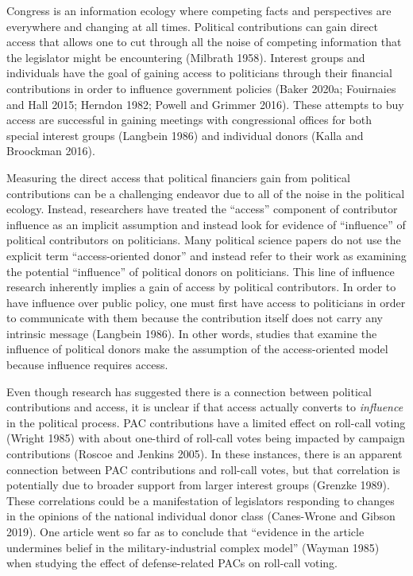 \documentclass[12pt,]{article}
\begin{document}
Congress is an information ecology where competing facts and
perspectives are everywhere and changing at all times. Political
contributions can gain direct access that allows one to cut through all
the noise of competing information that the legislator might be
encountering (Milbrath 1958). Interest groups and individuals have the
goal of gaining access to politicians through their financial
contributions in order to influence government policies (Baker 2020a;
Fouirnaies and Hall 2015; Herndon 1982; Powell and Grimmer 2016). These
attempts to buy access are successful in gaining meetings with
congressional offices for both special interest groups (Langbein 1986)
and individual donors (Kalla and Broockman 2016).

Measuring the direct access that political financiers gain from
political contributions can be a challenging endeavor due to all of the
noise in the political ecology. Instead, researchers have treated the
``access'' component of contributor influence as an implicit assumption
and instead look for evidence of ``influence'' of political contributors
on politicians. Many political science papers do not use the explicit
term ``access-oriented donor'' and instead refer to their work as
examining the potential ``influence'' of political donors on
politicians. This line of influence research inherently implies a gain
of access by political contributors. In order to have influence over
public policy, one must first have access to politicians in order to
communicate with them because the contribution itself does not carry any
intrinsic message (Langbein 1986). In other words, studies that examine
the influence of political donors make the assumption of the
access-oriented model because influence requires access.

Even though research has suggested there is a connection between
political contributions and access, it is unclear if that access
actually converts to \emph{influence} in the political process. PAC
contributions have a limited effect on roll-call voting (Wright 1985)
with about one-third of roll-call votes being impacted by campaign
contributions (Roscoe and Jenkins 2005). In these instances, there is an
apparent connection between PAC contributions and roll-call votes, but
that correlation is potentially due to broader support from larger
interest groups (Grenzke 1989). These correlations could be a
manifestation of legislators responding to changes in the opinions of
the national individual donor class (Canes-Wrone and Gibson 2019). One
article went so far as to conclude that ``evidence in the article
undermines belief in the military-industrial complex model'' (Wayman
1985) when studying the effect of defense-related PACs on roll-call
voting.
\end{document}
